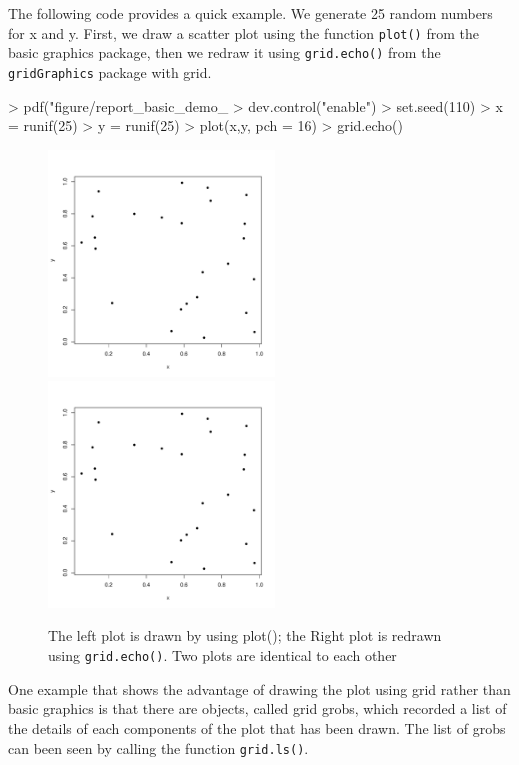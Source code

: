 \documentclass[paper=a4, fontsize=11pt]{report}
\begin{document}
The following code provides a quick example. We generate 25 random numbers for x and y. First, we draw a scatter plot using the function \texttt{plot()} from the basic graphics package, then we redraw it using \texttt{grid.echo()} from the \texttt{gridGraphics} package with grid.
\begin{Schunk}
\begin{Sinput}
> pdf("figure/report_basic_demo_%
> dev.control("enable")
> set.seed(110)
> x = runif(25)
> y = runif(25)
> plot(x,y, pch = 16)
> grid.echo()
\end{Sinput}
\end{Schunk}
\newpage
\begin{figure}[h]
\begin{center}
  \includegraphics[height = 6cm, width = 6cm]{figure/report_basic_demo_1.pdf}
  \includegraphics[height = 6cm, width = 6cm]{figure/report_basic_demo_1.pdf}
  \caption{The left plot is drawn by using plot(); the Right plot is redrawn using \texttt{grid.echo()}. Two plots are identical to each other}
  	\label{figure1}
\end{center}
\end{figure}
One example that shows the advantage of drawing the plot using grid rather than basic graphics is that there are objects, called grid grobs, which recorded a list of the details of each components of the plot that has been drawn. The list of grobs can been seen by calling the function \texttt{grid.ls()}. \\
\end{document}
